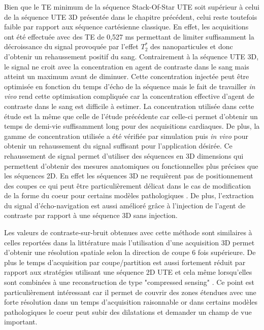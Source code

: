 Bien que le TE minimum de la séquence Stack-Of-Star UTE soit supérieur à celui de la séquence UTE 3D présentée dans le chapitre précédent, celui reste toutefois faible par rapport aux séquence cartésienne classique. En effet, les acquisitions ont été effectuée avec des TE de 0,527 ms permettant de limiter suffisamment la décroissance du signal provoquée par l'effet $T_2^*$ des nanoparticules et donc d'obtenir un rehaussement positif du sang. Contrairement à la séquence UTE 3D, le signal ne croit avec la concentration en agent de contraste dans le sang mais atteint un maximum avant de diminuer. Cette concentration injectée peut être optimisée en fonction du temps d'écho de la séquence mais le fait de travailler \textit{in vivo} rend cette optimisation compliquée car la concentration effective d'agent de contraste dans le sang est difficile à estimer. La concentration utilisée dans cette étude est la même que celle de l'étude précédente car celle-ci permet d'obtenir un temps de demi-vie suffisamment long pour des acquisitions cardiaques. De plus, la gamme de concentration utilisée a été vérifiée par simulation puis \textit{in vivo} pour obtenir un rehaussement du signal suffisant pour l'application désirée. 
Ce rehaussement de signal permet d'utiliser des séquences en 3D dimensions qui permettent d'obtenir des mesures anatomiques ou fonctionnelles plus précises que les séquences 2D. En effet les séquences 3D ne requièrent pas de positionnement des coupes ce qui peut être particulièrement délicat dans le cas de modification de la forme du coeur pour certains modèles pathologiques \cite{Friedrich:2000aa,Sheehan2008Three-dimension}. De plus, l'extraction du signal d'écho-navigation est aussi amélioré grâce à l'injection de l'agent de contraste par rapport à une séquence 3D sans injection.

Les valeurs de contraste-sur-bruit obtenues avec cette méthode sont similaires à celles reportées dans la littérature \cite{Hoerr:2013gf,Motaal:2015aa} mais l'utilisation d'une acquisition 3D permet d'obtenir une résolution spatiale selon la direction de coupe 6 fois supérieure. De plus le temps d'acquisition par coupe/partition est aussi fortement réduit par rapport aux stratégies utilisant une séquence 2D UTE et cela même lorsqu'elles sont combinées à une reconstruction de type "compressed sensing" \cite{Motaal:2015aa}. Ce point est particulièrement intéressant car il permet de couvrir des zones étendues avec une forte résolution dans un temps d'acquisition raisonnable or dans certains modèles pathologiques le coeur peut subir des dilatations et demander un champ de vue  important.

